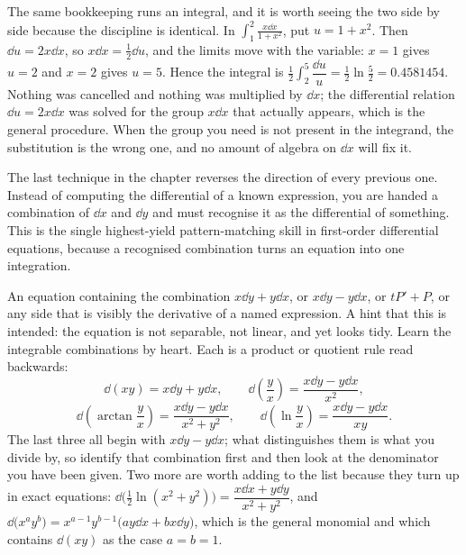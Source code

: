The same bookkeeping runs an integral, and it is worth seeing the two side by side because the discipline is identical. In $\displaystyle\int_1^{2}\frac{x\dd x}{1+x^{2}}$, put $u=1+x^{2}$. Then $\dd u=2x\dd x$, so $x\dd x=\tfrac12\dd u$, and the limits move with the variable: $x=1$ gives $u=2$ and $x=2$ gives $u=5$. Hence the integral is $\tfrac12\int_2^{5}\dfrac{\dd u}{u}=\tfrac12\ln\tfrac52=0.4581454$. Nothing was cancelled and nothing was multiplied by $\dd x$; the differential relation $\dd u=2x\dd x$ was solved for the group $x\dd x$ that actually appears, which is the general procedure. When the group you need is not present in the integrand, the substitution is the wrong one, and no amount of algebra on $\dd x$ will fix it.

The last technique in the chapter reverses the direction of every previous one. Instead of computing the differential of a known expression, you are handed a combination of $\dd x$ and $\dd y$ and must recognise it as the differential of something. This is the single highest-yield pattern-matching skill in first-order differential equations, because a recognised combination turns an equation into one integration.

\cue An equation containing the combination $x\dd y+y\dd x$, or $x\dd y-y\dd x$, or $tP'+P$, or any side that is visibly the derivative of a named expression. A hint that this is intended: the equation is not separable, not linear, and yet looks tidy.
\method Learn the integrable combinations by heart. Each is a product or quotient rule read backwards:
\[\dd(xy)=x\dd y+y\dd x,\qquad \dd\!\left(\frac yx\right)=\frac{x\dd y-y\dd x}{x^{2}},\]
\[\dd\!\left(\arctan\frac yx\right)=\frac{x\dd y-y\dd x}{x^{2}+y^{2}},\qquad \dd\!\left(\ln\frac yx\right)=\frac{x\dd y-y\dd x}{xy}.\]
The last three all begin with $x\dd y-y\dd x$; what distinguishes them is what you divide by, so identify that combination first and then look at the denominator you have been given. Two more are worth adding to the list because they turn up in exact equations: $\dd\bigl(\tfrac12\ln(x^{2}+y^{2})\bigr)=\dfrac{x\dd x+y\dd y}{x^{2}+y^{2}}$, and $\dd\bigl(x^{a}y^{b}\bigr)=x^{a-1}y^{b-1}\bigl(ay\dd x+bx\dd y\bigr)$, which is the general monomial and which contains $\dd(xy)$ as the case $a=b=1$.

